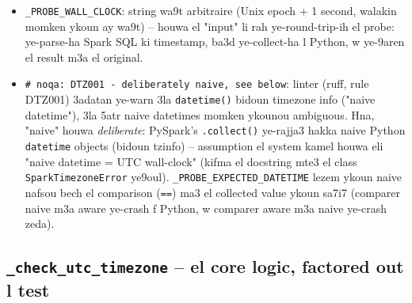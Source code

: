 \documentclass[11pt,a4paper]{report}
\DeclareRobustCommand{\code}[1]{\texttt{#1}}
\begin{document}
\begin{itemize}
  \item \code{\_PROBE\_WALL\_CLOCK}: string wa9t arbitraire (Unix epoch + 1
        second, walakin momken ykoun ay wa9t) -- houwa el "input" li rah
        ye-round-trip-ih el probe: ye-parse-ha Spark SQL ki timestamp, ba3d
        ye-collect-ha l Python, w ye-9aren el result m3a el original.
  \item \code{\# noqa: DTZ001 - deliberately naive, see below}: linter
        (ruff, rule DTZ001) 3adatan ye-warn 3la \code{datetime()} bidoun
        timezone info ("naive datetime"), 3la 5atr naive datetimes momken
        ykounou ambiguous. Hna, "naive" houwa \emph{deliberate}: PySpark's
        \code{.collect()} ye-rajja3 hakka naive Python \code{datetime}
        objects (bidoun tzinfo) -- assumption el system kamel houwa eli
        "naive datetime = UTC wall-clock" (kifma el docstring mte3 el
        class \code{SparkTimezoneError} ye9oul). \code{\_PROBE\_EXPECTED\_DATETIME}
        lezem ykoun naive nafsou bech el comparison (\code{==}) ma3 el
        collected value ykoun sa7i7 (comparer naive m3a aware ye-crash f
        Python, w comparer aware m3a naive ye-crash zeda).
\end{itemize}

\subsection{\code{\_check\_utc\_timezone} -- el core logic, factored out l test}
\end{document}
